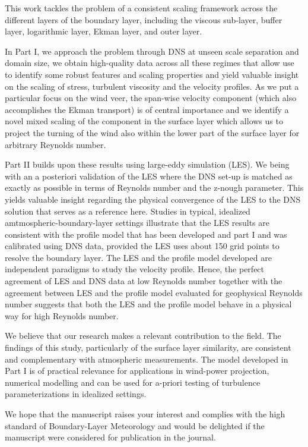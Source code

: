 \documentclass[brief]{fub}
\begin{document}
%
This work tackles the problem of a consistent scaling framework across the different layers of the boundary layer,
including the viscous sub-layer, buffer layer, logarithmic layer, Ekman layer, and outer layer.
%
\par
%
In Part I, we approach the problem through DNS at unseen scale separation and domain size, we obtain high-quality data across all
these regimes that allow use to identify some robust features and scaling properties and yield valuable insight
on the scaling of stress, turbulent viscosity and the velocity profiles.
%
As we put a particular focus on the wind veer, the span-wise velocity component (which also accomplishes the Ekman transport)
is of central importance and we identify a novel mixed scaling of the component in the surface layer which allows us
to project the turning of the wind also within the lower part of the surface layer for arbitrary Reynolds number.
% 
\par
%
Part II builds upon these results using large-eddy simulation (LES). We being with an a posteriori validation of the LES where
the DNS set-up is matched as exactly as possible in terms of Reynolds number and the z-nough parameter.
This yields valuable insight regarding the physical convergence of the LES to the DNS solution that serves as a reference here. 
%
Studies in typical, idealized amtmospheric-boundary-layer settings illustrate that the LES results are consistent with
the profile model that has been developed and part I and was calibrated using DNS data, provided the LES uses about 150 grid points to resolve the boundary layer.
%
The LES and the profile model developed are independent paradigms to study the velocity profile. Hence, the perfect agreement of LES and DNS data at low Reynolds number together with the agreement between LES and the profile model evaluated for geophysical Reynolds number suggests that both the LES and the profile model behave in a physical way for high Reynolds number. 
%
\par
%
We believe that our research makes a relevant contribution to the field.
%
The findings of this study, particularly of the surface layer similarity, are consistent and
complementary with atmospheric measurements.
%
The model developed in Part I is of practical relevance for applications in wind-power projection, numerical modelling
and can be used for a-priori testing of turbulence parameterizations in idealized settings. 
%
\par
%
We hope that the manuscript raises your interest and complies with the high standard of Boun\-da\-ry-Layer Meteorology and  would be delighted if the manuscript were considered for publication in the journal.

\end{document}
